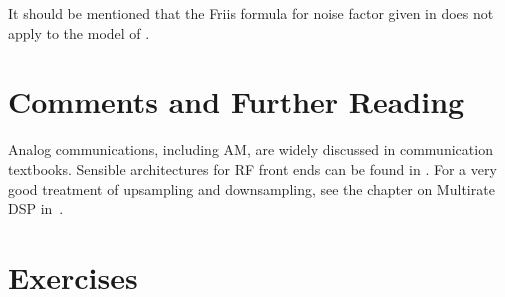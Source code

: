 It should be mentioned that the 
Friis formula for noise factor given in  does not apply
to the model of .
\eApplication



\section{Comments and Further Reading}

Analog communications, including AM, are widely discussed in communication textbooks. Sensible architectures for RF front ends can be found in \cite{Mak07}.
For a very good treatment of upsampling and downsampling, see the chapter on Multirate DSP in~\cite{Mitra10}.

\section{Exercises}
%
